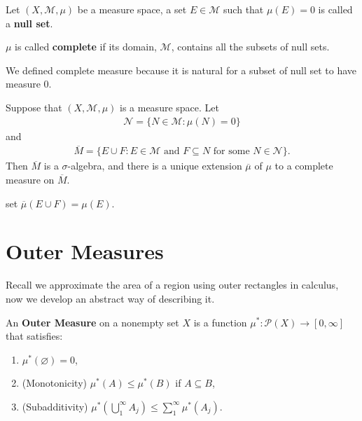 \begin{definition}
 \normalfont Let $(X, \mathcal{M}, \mu)$ be a measure space, a set $E \in \mathcal{M}$ such that $\mu(E) = 0$ is called a \textbf{null set}.

 $\mu$ is called \textbf{complete} if its domain, $\mathcal{M}$, contains all the subsets of null sets.
\end{definition}
We defined complete measure because it is natural for a subset of null set to have measure $0$.

\begin{theorem}
 \normalfont Suppose that $(X, \mathcal{M}, \mu)$ is a measure space. Let 
 \begin{align*}
    \mathcal{N} = \{ N \in \mathcal{M} : \mu(N) = 0 \}
 \end{align*}
 and
 \begin{align*}
    \overline{M} = \{ E \cup F : E \in \mathcal{M} \text{ and } F \subseteq N \text{ for some } N \in \mathcal{N} \}.
 \end{align*}
 Then $\overline{M}$ is a $\sigma$-algebra, and there is a unique extension $\overline{\mu}$ of $\mu$ to a complete measure on $\overline{M}$.
\end{theorem}
\begin{proofidea}
    set $\overline{\mu}(E \cup F) = \mu(E)$.
\end{proofidea}


\section{Outer Measures} \label{sec:}
\begin{motivation}
    Recall we approximate the area of a region using outer rectangles in calculus, now we develop an abstract way of describing it.
\end{motivation}
\begin{definition}
 \normalfont An \textbf{Outer Measure} on a nonempty set $X$ is a function $\mu^{*} : \mathcal{P}(X) \to [0,\infty]$ that satisfies:
 \begin{enumerate}
    \item $\mu^{*}(\varnothing) = 0$,
    \item (Monotonicity) $\mu^{*}(A) \le \mu^{*}(B)$ if $A \subseteq B$,
    \item (Subadditivity) $\mu^{*}(\bigcup_{1}^{\infty}A_j) \le \sum_{1}^{\infty} \mu^{*}(A_j)$.
 \end{enumerate}
\end{definition}

